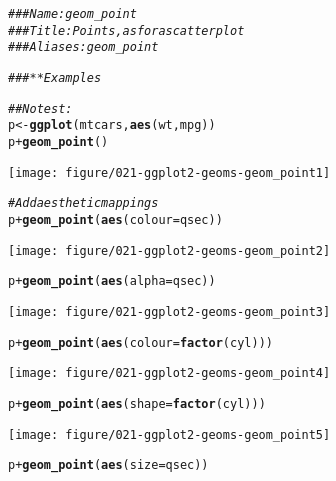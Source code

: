 \documentclass[a4paper,titlepage]{tufte-handout}\usepackage[]{graphicx}\usepackage[]{color}
\makeatletter
\def\maxwidth{ %
  \ifdim\Gin@nat@width>\linewidth
    \linewidth
  \else
    \Gin@nat@width
  \fi
}
\newcommand{\hlcom}[1]{\textcolor[rgb]{0.678,0.584,0.686}{\textit{#1}}}%
\newcommand{\hlopt}[1]{\textcolor[rgb]{0,0,0}{#1}}%
\newcommand{\hlstd}[1]{\textcolor[rgb]{0.345,0.345,0.345}{#1}}%
\newcommand{\hlkwb}[1]{\textcolor[rgb]{0.69,0.353,0.396}{#1}}%
\newcommand{\hlkwc}[1]{\textcolor[rgb]{0.333,0.667,0.333}{#1}}%
\newcommand{\hlkwd}[1]{\textcolor[rgb]{0.737,0.353,0.396}{\textbf{#1}}}%
\newenvironment{kframe}{%
 \def\at@end@of@kframe{}%
 \ifinner\ifhmode%
  \def\at@end@of@kframe{\end{minipage}}%
  \begin{minipage}{\columnwidth}%
 \fi\fi%
 \def\FrameCommand##1{\hskip\@totalleftmargin \hskip-\fboxsep
 \colorbox{shadecolor}{##1}\hskip-\fboxsep
     \hskip-\linewidth \hskip-\@totalleftmargin \hskip\columnwidth}%
 \MakeFramed {\advance\hsize-\width
   \@totalleftmargin\z@ \linewidth\hsize
   \@setminipage}}%
 {\par\unskip\endMakeFramed%
 \at@end@of@kframe}
\newenvironment{knitrout}{}{} %
\makeatother
\begin{document}
\begin{knitrout}
\color{fgcolor}\begin{kframe}
\begin{alltt}
\hlcom{### Name: geom_point}
\hlcom{### Title: Points, as for a scatterplot}
\hlcom{### Aliases: geom_point}

\hlcom{### ** Examples}

\hlcom{## No test: }
\hlstd{p} \hlkwb{<-} \hlkwd{ggplot}\hlstd{(mtcars,} \hlkwd{aes}\hlstd{(wt, mpg))}
\hlstd{p} \hlopt{+} \hlkwd{geom_point}\hlstd{()}
\end{alltt}
\end{kframe}
\texttt{[image: figure/021-ggplot2-geoms-geom\_point1]} 
\begin{kframe}\begin{alltt}
\hlcom{# Add aesthetic mappings}
\hlstd{p} \hlopt{+} \hlkwd{geom_point}\hlstd{(}\hlkwd{aes}\hlstd{(}\hlkwc{colour} \hlstd{= qsec))}
\end{alltt}
\end{kframe}
\texttt{[image: figure/021-ggplot2-geoms-geom\_point2]} 
\begin{kframe}\begin{alltt}
\hlstd{p} \hlopt{+} \hlkwd{geom_point}\hlstd{(}\hlkwd{aes}\hlstd{(}\hlkwc{alpha} \hlstd{= qsec))}
\end{alltt}
\end{kframe}
\texttt{[image: figure/021-ggplot2-geoms-geom\_point3]} 
\begin{kframe}\begin{alltt}
\hlstd{p} \hlopt{+} \hlkwd{geom_point}\hlstd{(}\hlkwd{aes}\hlstd{(}\hlkwc{colour} \hlstd{=} \hlkwd{factor}\hlstd{(cyl)))}
\end{alltt}
\end{kframe}
\texttt{[image: figure/021-ggplot2-geoms-geom\_point4]} 
\begin{kframe}\begin{alltt}
\hlstd{p} \hlopt{+} \hlkwd{geom_point}\hlstd{(}\hlkwd{aes}\hlstd{(}\hlkwc{shape} \hlstd{=} \hlkwd{factor}\hlstd{(cyl)))}
\end{alltt}
\end{kframe}
\texttt{[image: figure/021-ggplot2-geoms-geom\_point5]} 
\begin{kframe}\begin{alltt}
\hlstd{p} \hlopt{+} \hlkwd{geom_point}\hlstd{(}\hlkwd{aes}\hlstd{(}\hlkwc{size} \hlstd{= qsec))}
\end{alltt}

\end{kframe}
\end{knitrout}
\end{document}
